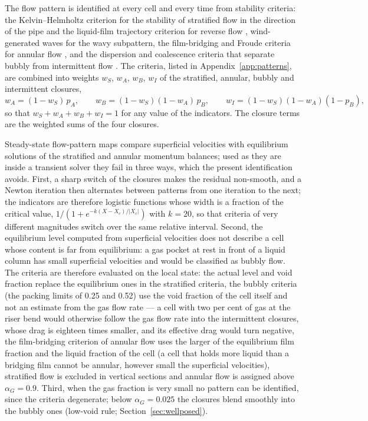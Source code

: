 \documentclass[a4paper,fleqn]{cas-sc}
\newcommand{\aG}{\alpha_G}
\begin{document}
The flow pattern is identified at every cell and every time from stability criteria: the Kelvin--Helmholtz criterion for the stability of stratified flow in the direction of the pipe and the liquid-film trajectory criterion for reverse flow \citep{taitel1976,barnea1982}, wind-generated waves for the wavy subpattern, the film-bridging and Froude criteria for annular flow \citep{taitel1980,barnea1987}, and the dispersion and coalescence criteria that separate bubbly from intermittent flow \citep{taitel1980,barnea1987}. The criteria, listed in Appendix~\ref{app:patterns}, are combined into weights $w_S$, $w_A$, $w_B$, $w_I$ of the stratified, annular, bubbly and intermittent closures,
\begin{equation}\label{eq:weights}
w_A = (1 - w_S)\,p_A, \qquad w_B = (1 - w_S)(1 - w_A)\,p_B, \qquad w_I = (1 - w_S)(1 - w_A)(1 - p_B),
\end{equation}
so that $w_S + w_A + w_B + w_I = 1$ for any value of the indicators. The closure terms are the weighted sums of the four closures.

Steady-state flow-pattern maps compare superficial velocities with equilibrium solutions of the stratified and annular momentum balances; used as they are inside a transient solver they fail in three ways, which the present identification avoids. First, a sharp switch of the closures makes the residual non-smooth, and a Newton iteration then alternates between patterns from one iteration to the next; the indicators are therefore logistic functions whose width is a fraction of the critical value, $1/(1 + e^{-k (X - X_c)/|X_c|})$ with $k = 20$, so that criteria of very different magnitudes switch over the same relative interval. Second, the equilibrium level computed from superficial velocities does not describe a cell whose content is far from equilibrium: a gas pocket at rest in front of a liquid column has small superficial velocities and would be classified as bubbly flow. The criteria are therefore evaluated on the local state: the actual level and void fraction replace the equilibrium ones in the stratified criteria, the bubbly criteria (the packing limits of 0.25 and 0.52) use the void fraction of the cell itself and not an estimate from the gas flow rate --- a cell with two per cent of gas at the riser bend would otherwise follow the gas flow rate into the intermittent closures, whose drag is eighteen times smaller, and its effective drag would turn negative, the film-bridging criterion of annular flow uses the larger of the equilibrium film fraction and the liquid fraction of the cell (a cell that holds more liquid than a bridging film cannot be annular, however small the superficial velocities), stratified flow is excluded in vertical sections and annular flow is assigned above $\aG = 0.9$. Third, when the gas fraction is very small no pattern can be identified, since the criteria degenerate; below $\aG = 0.025$ the closures blend smoothly into the bubbly ones (low-void rule; Section~\ref{sec:wellposed}).
\end{document}
